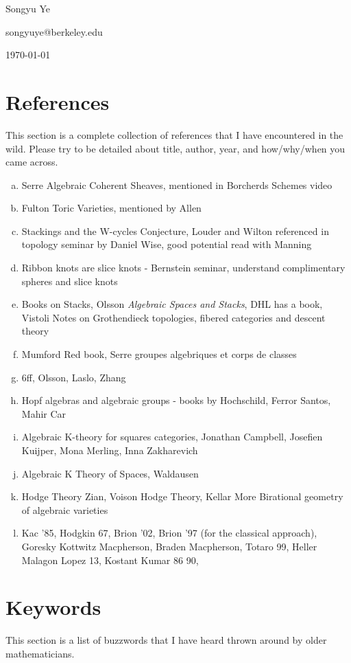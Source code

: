 \documentclass[12pt]{article}
\begin{document}
Songyu Ye 

songyuye@berkeley.edu

\today
\section{References}
This section is a complete collection of references that I have encountered in the wild. Please try to be detailed about title, author, year, and how/why/when you came across.
\begin{enumerate}[(a)]
    \item Serre Algebraic Coherent Sheaves, mentioned in Borcherds Schemes video
    \item Fulton Toric Varieties, mentioned by Allen
    \item Stackings and the W-cycles Conjecture, Louder and Wilton referenced in topology seminar by Daniel Wise, good potential read with Manning
    \item Ribbon knots are slice knots - Bernstein seminar, understand complimentary spheres and slice knots 
    \item Books on Stacks, Olsson \textit{Algebraic Spaces and Stacks}, DHL has a book, Vistoli Notes on Grothendieck topologies, fibered categories and descent theory
    \item Mumford Red book, Serre groupes algebriques et corps de classes
    \item 6ff, Olsson, Laslo, Zhang
    \item Hopf algebras and algebraic groups - books by Hochschild, Ferror Santos, Mahir Car
    \item Algebraic K-theory for squares categories, Jonathan Campbell, Josefien Kuijper, Mona Merling, Inna Zakharevich
    \item Algebraic K Theory of Spaces, Waldausen
    \item Hodge Theory Zian, Voison Hodge Theory, Kellar More Birational geometry of algebraic varieties
    \item Kac '85, Hodgkin 67, Brion '02, Brion '97 (for the classical approach), Goresky Kottwitz Macpherson, Braden Macpherson, Totaro 99, Heller Malagon Lopez 13, Kostant Kumar 86 90, 
 

    
\end{enumerate}

\section{Keywords}
This section is a list of buzzwords that I have heard thrown around by older mathematicians.
\end{document}
